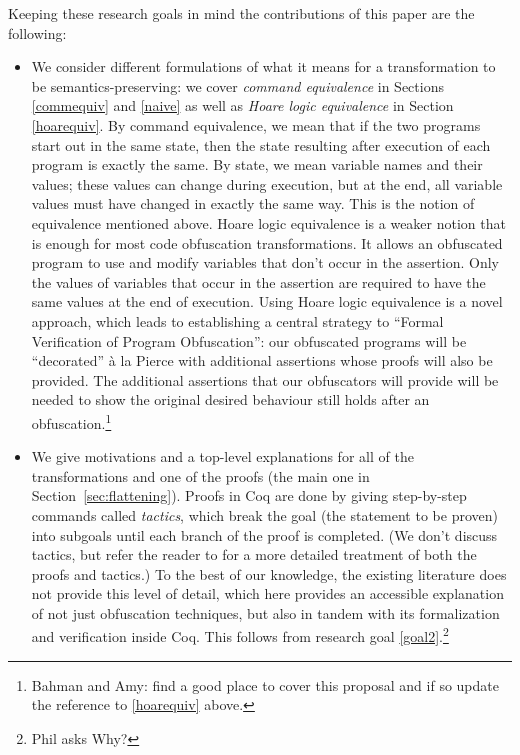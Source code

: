 \documentclass[compsoc,conference,a4paper,10pt,times]{IEEEtran}
\begin{document}
Keeping these research goals in mind the contributions of this paper are the following:
\begin{itemize}
    \item We consider different formulations of what it means for a transformation to be semantics-preserving: we cover \emph{command equivalence} in Sections \ref{commequiv} and \ref{naive} as well as \emph{Hoare logic equivalence} in Section \ref{hoarequiv}. By command equivalence, we mean that if the two programs start out in the same state, then the state resulting after execution of each program is exactly the same.  By state, we mean variable names and their values; these values can change during execution, but at the end, all variable values must have changed in exactly the same way.  This is the notion of equivalence mentioned above. Hoare logic equivalence is a weaker notion that is enough for most code obfuscation transformations. It allows an obfuscated program to use and modify variables that don't occur in the assertion.  Only the values of variables that occur in the assertion are required to have the same values at the end of execution.  Using Hoare logic equivalence is a novel approach, which leads to establishing a central strategy to ``Formal Verification of Program Obfuscation'': our obfuscated programs will be ``decorated''  \`a la  Pierce \cite{SFV2} with additional assertions whose proofs will also be provided\label{itm:1}. The additional assertions that our obfuscators will provide will be needed to show the original desired behaviour still holds after an obfuscation.\footnote{Bahman and Amy: find a good place to cover this proposal and if so update the reference to \ref{hoarequiv} above.}
    
    
    \item We give motivations and a top-level explanations for all of the transformations and one of the proofs (the main one in Section~\ref{sec:flattening}).  Proofs in Coq are done by giving step-by-step commands called \emph{tactics}, which break the goal (the statement to be proven) into subgoals until each branch of the proof is completed.  (We don't discuss tactics, but
    refer the reader to \cite{Weiyun} for a more detailed treatment of both the proofs and tactics.) To the best of our knowledge, the existing literature does not provide this level of detail, which here provides an accessible explanation of not just obfuscation techniques, but also in tandem with its formalization and verification inside Coq. This follows from research goal \ref{goal2}.\footnote{Phil asks Why?}\label{itm:2}
 

\end{itemize}
\end{document}
